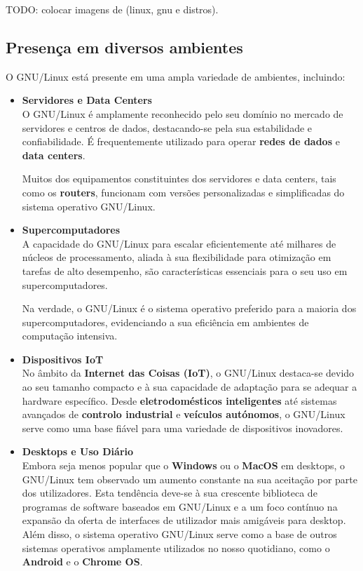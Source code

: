 TODO: colocar imagens de (linux, gnu e distros).

\newpage
\subsection{Presença em diversos ambientes}
O GNU/Linux está presente em uma ampla variedade de ambientes, incluindo:
\begin{itemize}

    \item \textbf{Servidores e Data Centers}\\
    O GNU/Linux é amplamente reconhecido pelo seu domínio no mercado de servidores e centros de dados, destacando-se pela sua estabilidade e confiabilidade. É frequentemente utilizado para operar \textbf{redes de dados} e \textbf{data centers}.

    Muitos dos equipamentos constituintes dos servidores e data centers, tais como os \textbf{routers}, funcionam com versões personalizadas e simplificadas do sistema operativo GNU/Linux.
    

    \item \textbf{Supercomputadores}\\
    A capacidade do GNU/Linux para escalar eficientemente até milhares de núcleos de processamento, aliada à sua flexibilidade para otimização em tarefas de alto desempenho, são características essenciais para o seu uso em supercomputadores. 
    
    Na verdade, o GNU/Linux é o sistema operativo preferido para a maioria dos supercomputadores, evidenciando a sua eficiência em ambientes de computação intensiva.
    

    \item \textbf{Dispositivos IoT}\\
    No âmbito da \textbf{Internet das Coisas (IoT)}, o GNU/Linux destaca-se devido ao seu tamanho compacto e à sua capacidade de adaptação para se adequar a hardware específico. Desde \textbf{eletrodomésticos inteligentes} até sistemas avançados de \textbf{controlo industrial} e \textbf{veículos autónomos}, o GNU/Linux serve como uma base fiável para uma variedade de dispositivos inovadores.
    

    \item \textbf{Desktops e Uso Diário}\\
    Embora seja menos popular que o \textbf{Windows} ou o \textbf{MacOS} em desktops, o GNU/Linux tem observado um aumento constante na sua aceitação por parte dos utilizadores. Esta tendência deve-se à sua crescente biblioteca de programas de software baseados em GNU/Linux e a um foco contínuo na expansão da oferta de interfaces de utilizador mais amigáveis para desktop. Além disso, o sistema operativo GNU/Linux serve como a base de outros sistemas operativos amplamente utilizados no nosso quotidiano, como o \textbf{Android} e o \textbf{Chrome OS}.
    


\end{itemize}
